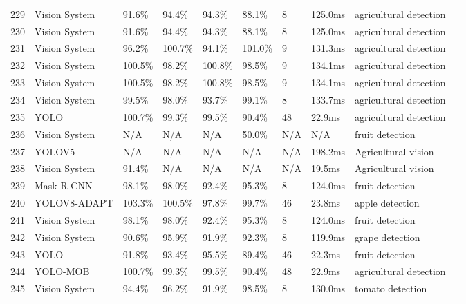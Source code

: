 \begin{table*}[htbp]
\begin{tabular}{p{}p{}p{}p{}p{}p{}p{}p{}p{}p{}}
 229 & Vision System & 91.6\% & 94.4\% & 94.3\% & 88.1\% & 8 & 125.0ms & agricultural detection & \cite{Ahmad:2020} \\
 230 & Vision System & 91.6\% & 94.4\% & 94.3\% & 88.1\% & 8 & 125.0ms & agricultural detection & \cite{Loganathan:2019} \\
 231 & Vision System & 96.2\% & 100.7\% & 94.1\% & 101.0\% & 9 & 131.3ms & agricultural detection & \cite{Huda:2024_hwpso} \\
 232 & Vision System & 100.5\% & 98.2\% & 100.8\% & 98.5\% & 9 & 134.1ms & agricultural detection & \cite{Arrouch:2022a} \\
 233 & Vision System & 100.5\% & 98.2\% & 100.8\% & 98.5\% & 9 & 134.1ms & agricultural detection & \cite{Arrouch:2022b} \\
 234 & Vision System & 99.5\% & 98.0\% & 93.7\% & 99.1\% & 8 & 133.7ms & agricultural detection & \cite{Ng:2023_iot} \\
 235 & YOLO & 100.7\% & 99.3\% & 99.5\% & 90.4\% & 48 & 22.9ms & agricultural detection & \cite{li2024accurate} \\
 236 & Vision System & N/A & N/A & N/A & 50.0\% & N/A & N/A & fruit detection & \cite{ZHOU2024110} \\
 237 & YOLOV5 & N/A & N/A & N/A & N/A & N/A & 198.2ms & Agricultural vision & \cite{ZHANG2024108780} \\
 238 & Vision System & 91.4\% & N/A & N/A & N/A & N/A & 19.5ms & Agricultural vision & \cite{LU2024108721} \\
 239 & Mask R-CNN & 98.1\% & 98.0\% & 92.4\% & 95.3\% & 8 & 124.0ms & fruit detection & \cite{wang2024robust} \\
 240 & YOLOV8-ADAPT & 103.3\% & 100.5\% & 97.8\% & 99.7\% & 46 & 23.8ms & apple detection & \cite{zhang2024adaptive} \\
 241 & Vision System & 98.1\% & 98.0\% & 92.4\% & 95.3\% & 8 & 124.0ms & fruit detection & \cite{chen2024deep} \\
 242 & Vision System & 90.6\% & 95.9\% & 91.9\% & 92.3\% & 8 & 119.9ms & grape detection & \cite{ieee2024grape} \\
 243 & YOLO & 91.8\% & 93.4\% & 95.5\% & 89.4\% & 46 & 22.3ms & fruit detection & \cite{agrieng2024stone} \\
 244 & YOLO-MOB & 100.7\% & 99.3\% & 99.5\% & 90.4\% & 48 & 22.9ms & agricultural detection & \cite{compel2024citrus} \\
 245 & Vision System & 94.4\% & 96.2\% & 91.9\% & 98.5\% & 8 & 130.0ms & tomato detection & \cite{jiang2024tomato} \\

\end{tabular}
\end{table*}
